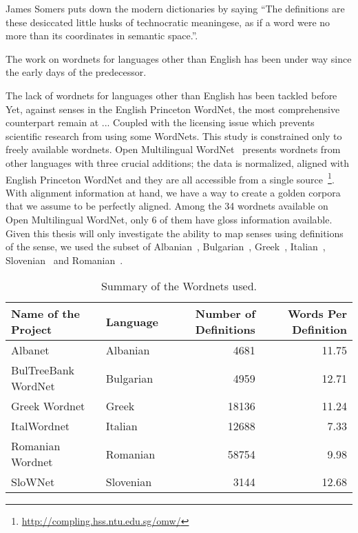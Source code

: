 James Somers puts down the modern dictionaries by saying \enquote{The definitions are these desiccated little husks of technocratic meaningese, as if a word were no more than its coordinates in semantic space.}\cite{somers_youre_2014}.

The work on wordnets for languages other than English has been under way since the early days of the predecessor.

The lack of wordnets for languages other than English has been tackled before %
Yet, against %
senses in the English Princeton WordNet, the most comprehensive counterpart remain at ... %
Coupled with the licensing issue which prevents scientific research from using some WordNets.
This study is constrained only to freely available wordnets.
Open Multilingual WordNet~\cite{bond_survey_2012} presents wordnets from other languages with three crucial additions; %
the data is normalized, aligned with English Princeton WordNet and they are all accessible from a single source~\footnote{\url{http://compling.hss.ntu.edu.sg/omw/}}.
With alignment information at hand, we have a way to create a golden corpora that we assume to be perfectly aligned.
Among the 34 wordnets available on Open Multilingual WordNet, only 6 of them have gloss information available.
Given this thesis will only investigate the ability to map senses using definitions of the sense, we used the subset of Albanian~\cite{ruci_current_2008}, Bulgarian~\cite{simov_constructing_2010}, Greek~\cite{stamou_exploring_2004}, Italian~\cite{pianta_multiwordnet_2002}, Slovenian~\cite{fiser_slownet_2012} and Romanian~\cite{tufis_romanian_2008}.
\begin{table*}[!hbp]
    \begin{center}
        \caption{Summary of the Wordnets used.}\label{tab:summary_table}
        \begin{tabular}{llrr}
            \toprule%
            \textbf{Name of the Project} & \textbf{Language} & \textbf{Number of Definitions} & \textbf{Words Per Definition} \\
            \midrule%
            Albanet & Albanian & 4681 & 11.75 \\
            BulTreeBank WordNet & Bulgarian & 4959 & 12.71 \\
            Greek Wordnet & Greek & 18136 & 11.24 \\
            ItalWordnet & Italian & 12688 & 7.33 \\
            Romanian Wordnet & Romanian & 58754 & 9.98 \\
            SloWNet & Slovenian & 3144 & 12.68 \\
            \bottomrule %
        \end{tabular}
    \end{center}
\end{table*}

